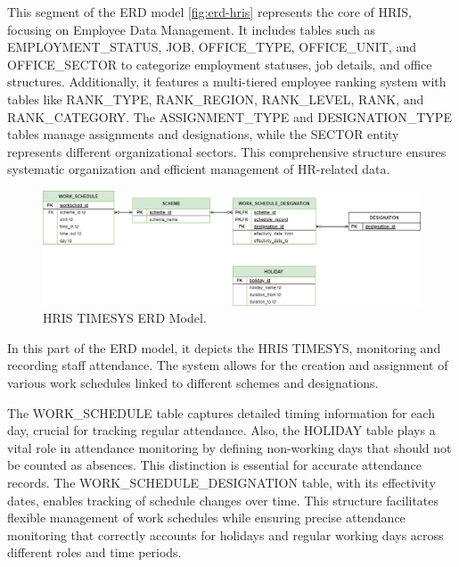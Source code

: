     This segment of the ERD model \ref*{fig:erd-hris} represents the core of HRIS, focusing on Employee Data Management. It includes tables such as EMPLOYMENT\_STATUS, JOB, OFFICE\_TYPE, OFFICE\_UNIT, and OFFICE\_SECTOR to categorize employment statuses, job details, and office structures. Additionally, it features a multi-tiered employee ranking system with tables like RANK\_TYPE, RANK\_REGION, RANK\_LEVEL, RANK, and RANK\_CATEGORY. The ASSIGNMENT\_TYPE and DESIGNATION\_TYPE tables manage assignments and designations, while the SECTOR entity represents different organizational sectors. This comprehensive structure ensures systematic organization and efficient management of HR-related data.
    
    \begin{figure}[H]
        \centering
        \includegraphics[width=1\linewidth]{figures/images/erd-timesys.png}
        \caption{HRIS TIMESYS ERD Model.}
        \label{fig:erd-timesys}
    \end{figure}

    In this part of the ERD model, it depicts the HRIS TIMESYS, monitoring and recording staff attendance. The system allows for the creation and assignment of various work schedules linked to different schemes and designations. 

    The WORK\_SCHEDULE table captures detailed timing information for each day, crucial for tracking regular attendance. Also, the HOLIDAY table plays a vital role in attendance monitoring by defining non-working days that should not be counted as absences. This distinction is essential for accurate attendance records. The WORK\_SCHEDULE\_DESIGNATION table, with its effectivity dates, enables tracking of schedule changes over time. This structure facilitates flexible management of work schedules while ensuring precise attendance monitoring that correctly accounts for holidays and regular working days across different roles and time periods.


